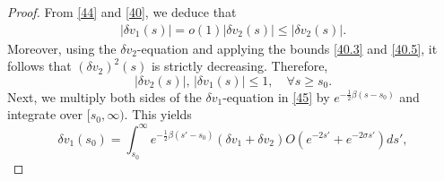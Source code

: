 \documentclass[12pt]{amsart}
\begin{document}
\begin{proof}
From \eqref{44} and \eqref{40}, we deduce that 
\begin{align}\label{40.5}
|\delta v_1(s)|=o(1)|\delta v_2(s)|\le |\delta v_2(s)|.
\end{align}
Moreover, using the $\delta v_2$-equation and applying the bounds \eqref{40.3} and \eqref{40.5}, it follows that $(\delta v_2)^2(s)$ is strictly decreasing. Therefore,
 \[
|\delta v_2(s)|, \, |\delta v_1(s)|\le 1, \quad \forall s\ge s_0. 
\]
Next, we multiply both sides of the $\delta v_1$-equation in \eqref{45} by $e^{-\frac 12 \beta(s-s_0)}$ and integrate over $[s_0, \infty)$. This yields 
\[
\delta v_1(s_0)= \int_{s_0}^\infty e^{-\frac 12\beta(s'-s_0)}(\delta v_1+\delta v_2)O(e^{-2s'}+e^{-2\sigma s'} )ds',
\]
%
%
%
%
%

\end{proof}
\end{document}
